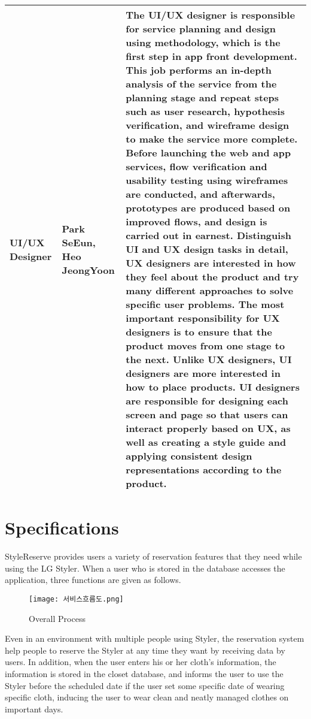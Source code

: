 \documentclass[conference]{IEEEtran}
\begin{document}
\begin{table}[htbp]
\begin{tabular}{| p{1cm}|p{1.5cm}|p{5.2cm} |}
\hline
UI/UX Designer & Park SeEun, Heo JeongYoon & The UI/UX designer is responsible for service planning and design using methodology, which is the first step in app front development. This job performs an in-depth analysis of the service from the planning stage and repeat steps such as user research, hypothesis verification, and wireframe design to make the service more complete. Before launching the web and app services, flow verification and usability testing using wireframes are conducted, and afterwards, prototypes are produced based on improved flows, and design is carried out in earnest.
Distinguish UI and UX design tasks in detail, UX designers are interested in how they feel about the product and try many different approaches to solve specific user problems. The most important responsibility for UX designers is to ensure that the product moves from one stage to the next. Unlike UX designers, UI designers are more interested in how to place products. UI designers are responsible for designing each screen and page so that users can interact properly based on UX, as well as creating a style guide and applying consistent design representations according to the product. \\
\hline

\end{tabular}
\end{table}

\section{Specifications}
StyleReserve provides users a variety of reservation features that they need while using the LG Styler. When a user who is stored in the database accesses the application, three functions are given as follows.

\begin{figure}[htbp]
\centerline{\texttt{[image: 서비스흐름도.png]}}
\caption{Overall Process}
\label{fig}
\end{figure}

Even in an environment with multiple people using Styler, the reservation system help people to reserve the Styler at any time they want by receiving data by users.
In addition, when the user enters his or her cloth's information, the information is stored in the closet database, and informs the user to use the Styler before the scheduled date if the user set some specific date of wearing specific cloth, inducing the user to wear clean and neatly managed clothes on important days.\\
\end{document}
